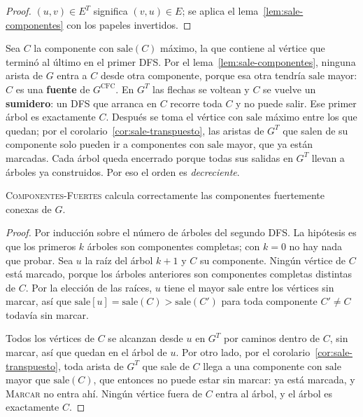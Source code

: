 \documentclass[11pt,letterpaper]{article}
\begin{document}
\begin{proof}
  $(u, v) \in E^T$ significa $(v, u) \in E$; se aplica el
  lema~\ref{lem:sale-componentes} con los papeles invertidos.
\end{proof}

\begin{idea}
  Sea $C$ la componente con $\text{sale}(C)$ máximo, la que contiene al
  vértice que terminó al último en el primer DFS. Por el
  lema~\ref{lem:sale-componentes}, ninguna arista de $G$ entra a $C$
  desde otra componente, porque esa otra tendría $\text{sale}$ mayor:
  $C$ es una \textbf{fuente} de $G^{\text{CFC}}$. En $G^T$ las flechas
  se voltean y $C$ se vuelve un \textbf{sumidero}: un DFS que arranca
  en $C$ recorre toda $C$ y no puede salir. Ese primer árbol es
  exactamente $C$. Después se toma el vértice con $\text{sale}$ máximo
  entre los que quedan; por el corolario~\ref{cor:sale-transpuesto},
  las aristas de $G^T$ que salen de su componente solo pueden ir a
  componentes con $\text{sale}$ mayor, que ya están marcadas. Cada
  árbol queda encerrado porque todas sus salidas en $G^T$ llevan a
  árboles ya construidos. Por eso el orden es \emph{decreciente}.
\end{idea}

\begin{teorema}
  \label{teo:componentes-fuertes}
  {\upshape\textsc{Componentes-Fuertes}} calcula correctamente las
  componentes fuertemente conexas de $G$.
\end{teorema}

\begin{proof}
  Por inducción sobre el número de árboles del segundo DFS. La
  hipótesis es que los primeros $k$ árboles son componentes completas;
  con $k = 0$ no hay nada que probar. Sea $u$ la raíz del árbol
  $k + 1$ y $C$ su componente. Ningún vértice de $C$ está marcado,
  porque los árboles anteriores son componentes completas distintas de
  $C$. Por la elección de las raíces, $u$ tiene el mayor $\text{sale}$
  entre los vértices sin marcar, así que
  $\text{sale}[u] = \text{sale}(C) > \text{sale}(C')$ para toda
  componente $C' \neq C$ todavía sin marcar.

  Todos los vértices de $C$ se alcanzan desde $u$ en $G^T$ por caminos
  dentro de $C$, sin marcar, así que quedan en el árbol de $u$. Por
  otro lado, por el corolario~\ref{cor:sale-transpuesto}, toda arista
  de $G^T$ que sale de $C$ llega a una componente con $\text{sale}$
  mayor que $\text{sale}(C)$, que entonces no puede estar sin marcar:
  ya está marcada, y \textsc{Marcar} no entra ahí. Ningún vértice fuera
  de $C$ entra al árbol, y el árbol es exactamente $C$.
\end{proof}
\end{document}
